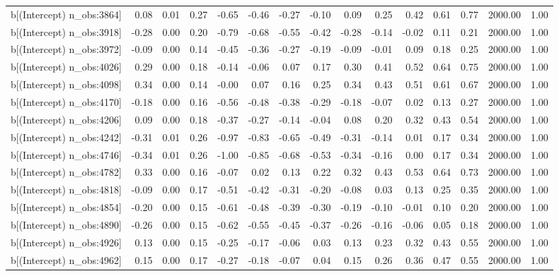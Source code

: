 \begin{table}[ht]
\begin{tabular}{rrrrrrrrrrrrrrr}
  b[(Intercept) n\_obs:3864] & 0.08 & 0.01 & 0.27 & -0.65 & -0.46 & -0.27 & -0.10 & 0.09 & 0.25 & 0.42 & 0.61 & 0.77 & 2000.00 & 1.00 \\ 
  b[(Intercept) n\_obs:3918] & -0.28 & 0.00 & 0.20 & -0.79 & -0.68 & -0.55 & -0.42 & -0.28 & -0.14 & -0.02 & 0.11 & 0.21 & 2000.00 & 1.00 \\ 
  b[(Intercept) n\_obs:3972] & -0.09 & 0.00 & 0.14 & -0.45 & -0.36 & -0.27 & -0.19 & -0.09 & -0.01 & 0.09 & 0.18 & 0.25 & 2000.00 & 1.00 \\ 
  b[(Intercept) n\_obs:4026] & 0.29 & 0.00 & 0.18 & -0.14 & -0.06 & 0.07 & 0.17 & 0.30 & 0.41 & 0.52 & 0.64 & 0.75 & 2000.00 & 1.00 \\ 
  b[(Intercept) n\_obs:4098] & 0.34 & 0.00 & 0.14 & -0.00 & 0.07 & 0.16 & 0.25 & 0.34 & 0.43 & 0.51 & 0.61 & 0.67 & 2000.00 & 1.00 \\ 
  b[(Intercept) n\_obs:4170] & -0.18 & 0.00 & 0.16 & -0.56 & -0.48 & -0.38 & -0.29 & -0.18 & -0.07 & 0.02 & 0.13 & 0.27 & 2000.00 & 1.00 \\ 
  b[(Intercept) n\_obs:4206] & 0.09 & 0.00 & 0.18 & -0.37 & -0.27 & -0.14 & -0.04 & 0.08 & 0.20 & 0.32 & 0.43 & 0.54 & 2000.00 & 1.00 \\ 
  b[(Intercept) n\_obs:4242] & -0.31 & 0.01 & 0.26 & -0.97 & -0.83 & -0.65 & -0.49 & -0.31 & -0.14 & 0.01 & 0.17 & 0.34 & 2000.00 & 1.00 \\ 
  b[(Intercept) n\_obs:4746] & -0.34 & 0.01 & 0.26 & -1.00 & -0.85 & -0.68 & -0.53 & -0.34 & -0.16 & 0.00 & 0.17 & 0.34 & 2000.00 & 1.00 \\ 
  b[(Intercept) n\_obs:4782] & 0.33 & 0.00 & 0.16 & -0.07 & 0.02 & 0.13 & 0.22 & 0.32 & 0.43 & 0.53 & 0.64 & 0.73 & 2000.00 & 1.00 \\ 
  b[(Intercept) n\_obs:4818] & -0.09 & 0.00 & 0.17 & -0.51 & -0.42 & -0.31 & -0.20 & -0.08 & 0.03 & 0.13 & 0.25 & 0.35 & 2000.00 & 1.00 \\ 
  b[(Intercept) n\_obs:4854] & -0.20 & 0.00 & 0.15 & -0.61 & -0.48 & -0.39 & -0.30 & -0.19 & -0.10 & -0.01 & 0.10 & 0.20 & 2000.00 & 1.00 \\ 
  b[(Intercept) n\_obs:4890] & -0.26 & 0.00 & 0.15 & -0.62 & -0.55 & -0.45 & -0.37 & -0.26 & -0.16 & -0.06 & 0.05 & 0.18 & 2000.00 & 1.00 \\ 
  b[(Intercept) n\_obs:4926] & 0.13 & 0.00 & 0.15 & -0.25 & -0.17 & -0.06 & 0.03 & 0.13 & 0.23 & 0.32 & 0.43 & 0.55 & 2000.00 & 1.00 \\ 
  b[(Intercept) n\_obs:4962] & 0.15 & 0.00 & 0.17 & -0.27 & -0.18 & -0.07 & 0.04 & 0.15 & 0.26 & 0.36 & 0.47 & 0.55 & 2000.00 & 1.00 \\ 

\end{tabular}
\end{table}

